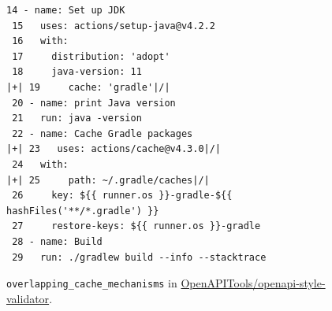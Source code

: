 \begin{figure}[!htbp]
\centering
\begin{lstlisting}[style=ccscase]
 14 - name: Set up JDK
 15   uses: actions/setup-java@v4.2.2
 16   with:
 17     distribution: 'adopt'
 18     java-version: 11
|+| 19     cache: 'gradle'|/|
 20 - name: print Java version
 21   run: java -version
 22 - name: Cache Gradle packages
|+| 23   uses: actions/cache@v4.3.0|/|
 24   with:
|+| 25     path: ~/.gradle/caches|/|
 26     key: ${{ runner.os }}-gradle-${{ hashFiles('**/*.gradle') }}
 27     restore-keys: ${{ runner.os }}-gradle
 28 - name: Build
 29   run: ./gradlew build --info --stacktrace
\end{lstlisting}
\caption{\texttt{overlapping\_cache\_mechanisms} in \href{https://github.com/OpenAPITools/openapi-style-validator/blob/13eb4eb01c11b7de4840867f06f79f97d9e14e07/.github/workflows/build.yml}{OpenAPITools/openapi-style-validator}.}
\label{fig:ccs-overlapping-mechanisms}
\end{figure}
